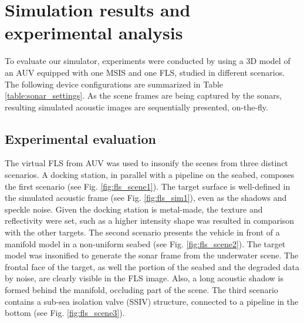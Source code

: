 \documentclass[final,5p,times]{elsarticle}
\begin{document}
\section{Simulation results and experimental analysis}
\label{results}

To evaluate our simulator, experiments were conducted by using a 3D model
of an AUV equipped with one MSIS and one FLS, studied in different scenarios.
The following device configurations are summarized in
Table \ref{table:sonar_settings}. As the scene frames are being captured by
the sonars, resulting simulated acoustic images are sequentially presented,
on-the-fly.

\subsection{Experimental evaluation}

The virtual FLS from AUV was used to insonify the scenes from three distinct
scenarios. A docking station, in parallel with a pipeline on the seabed,
composes the first scenario (see Fig. \ref{fig:fls_scene1}). The
target surface is well-defined in the simulated acoustic frame (see
Fig. \ref{fig:fls_sim1}), even as the shadows and speckle noise. Given the
docking station is metal-made, the texture and reflectivity were set, such
as a higher intensity shape was resulted in comparison with the other targets.
The second scenario presents the vehicle in front of a manifold model
in a non-uniform seabed (see Fig. \ref{fig:fls_scene2}). The target model was
insonified to generate the sonar frame from the underwater scene. The frontal
face of the target, as well the portion of the seabed and the degraded data
by noise, are clearly visible in the FLS image. Also, a long acoustic shadow
is formed behind the manifold, occluding part of the scene. The
third scenario contains a sub-sea isolation valve (SSIV) structure, connected
to a pipeline in the bottom (see Fig. \ref{fig:fls_scene3}).
\end{document}
